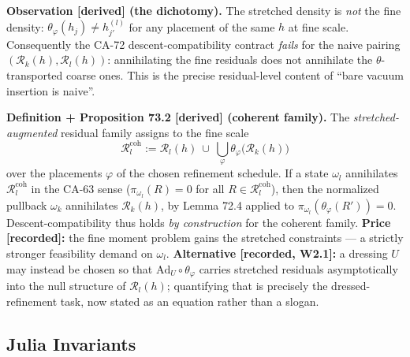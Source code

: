 \textbf{Observation [derived] (the dichotomy).}  The stretched density is
\emph{not} the fine density: \(\theta_\varphi(h_j)\ne h^{(l)}_{j'}\) for
any placement of the same \(h\) at fine scale.  Consequently the CA-72
descent-compatibility contract \emph{fails} for the naive pairing
\((\mathcal R_k(h),\mathcal R_l(h))\): annihilating the fine residuals does
not annihilate the \(\theta\)-transported coarse ones.  This is the precise
residual-level content of ``bare vacuum insertion is naive''.

\textbf{Definition + Proposition 73.2 [derived] (coherent family).}  The
\emph{stretched-augmented} residual family assigns to the fine scale
\[
  \mathcal R^{\mathrm{coh}}_l
  :=\mathcal R_l(h)\ \cup\
  \bigcup_{\varphi}\theta_\varphi\bigl(\mathcal R_k(h)\bigr)
\]
over the placements \(\varphi\) of the chosen refinement schedule.  If a
state \(\omega_l\) annihilates \(\mathcal R^{\mathrm{coh}}_l\) in the
CA-63 sense (\(\pi_{\omega_l}(R)=0\) for all
\(R\in\mathcal R^{\mathrm{coh}}_l\)), then the normalized pullback
\(\omega_k\) annihilates \(\mathcal R_k(h)\), by Lemma 72.4 applied to
\(\pi_{\omega_l}(\theta_\varphi(R'))=0\).  Descent-compatibility thus holds
\emph{by construction} for the coherent family.  \textbf{Price [recorded]:}
the fine moment problem gains the stretched constraints --- a strictly
stronger feasibility demand on \(\omega_l\).  \textbf{Alternative
[recorded, W2.1]:} a dressing \(U\) may instead be chosen so that
\(\mathrm{Ad}_U\circ\theta_\varphi\) carries stretched residuals
asymptotically into the null structure of \(\mathcal R_l(h)\); quantifying
that is precisely the dressed-refinement task, now stated as an equation
rather than a slogan.

\subsection{Julia Invariants}

